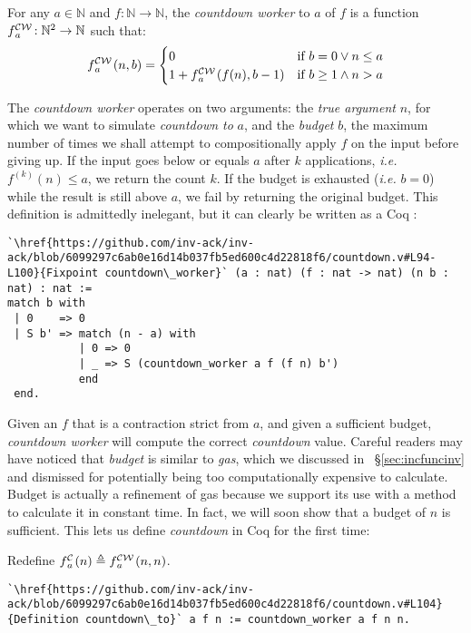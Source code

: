 \begin{defn} \label{defn: countdown-worker}
For any $a\in \mathbb{N}$ and $f: \mathbb{N}\to \mathbb{N}$, the \emph{countdown worker} to $a$ of $f$ is a function $\cdw{f}{a}\ : \mathbb{N}^2\to \mathbb{N}$ such that:
\begin{equation*}
\cdw{f}{a}(n, b) = \begin{cases}
0 & \text{if } b = 0 \vee n\le a \\ 1 +\cdw{f}{a}(f(n), b-1) & \text{if } b \ge 1 \wedge n > a
\end{cases}
\end{equation*}
\end{defn}
The \emph{countdown worker} operates on two arguments: 
the \emph{true argument} $n$, for which we want to simulate 
\emph{countdown to} $a$, 
and the \emph{budget} $b$, the maximum number of times we shall attempt 
to compositionally apply $f$ on the input before giving up. 
If the input goes below or equals $a$ after $k$ applications, \emph{i.e.} $f^{(k)}(n) \le a$, we return the count $k$. If the budget is exhausted (\emph{i.e.} $b = 0$) while the result is still above $a$, we fail by returning the original budget. This definition is admittedly inelegant, but it can clearly be written as a Coq :
\begin{lstlisting}
`\href{https://github.com/inv-ack/inv-ack/blob/6099297c6ab0e16d14b037fb5ed600c4d22818f6/countdown.v#L94-L100}{Fixpoint countdown\_worker}` (a : nat) (f : nat -> nat) (n b : nat) : nat :=
match b with
 | 0    => 0
 | S b' => match (n - a) with
           | 0 => 0
           | _ => S (countdown_worker a f (f n) b') 
           end
 end.
\end{lstlisting}
Given an $f$ that is a contraction strict from $a$, 
and given a sufficient budget, \emph{countdown worker} 
will compute the correct \emph{countdown} value.  
Careful readers may have noticed that \emph{budget} is similar to 
\emph{gas}, which we discussed in ~\S\ref{sec:incfuncinv} 
and dismissed for potentially 
being too computationally expensive to calculate. 
Budget is actually a refinement of gas because 
we support its use with a method to calculate it in constant time.
In fact, we will soon show that a budget of $n$ is sufficient. 
This lets us define \emph{countdown} in Coq for the first time:
\begin{defn} \label{defn: countdown}
Redefine $\cdt{f}{a}(n) \triangleq \cdw{f}{a}(n, n)$.
\begin{lstlisting}
`\href{https://github.com/inv-ack/inv-ack/blob/6099297c6ab0e16d14b037fb5ed600c4d22818f6/countdown.v#L104}{Definition countdown\_to}` a f n := countdown_worker a f n n.
\end{lstlisting}
\end{defn}
